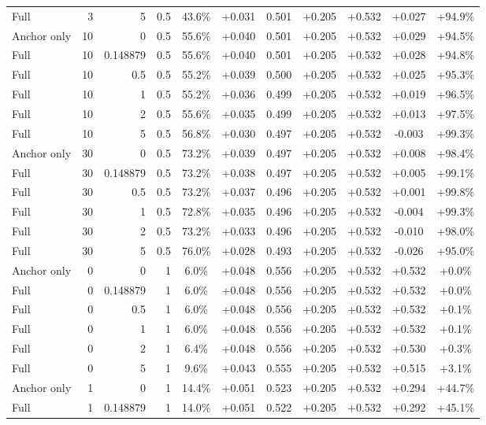\begin{table}[htbp]
\begin{tabular}{lrrrccccccc}
Full & 3 & 5 & 0.5 & 43.6\% & +0.031 & 0.501 & +0.205 & +0.532 & +0.027 & +94.9\% \\
Anchor only & 10 & 0 & 0.5 & 55.6\% & +0.040 & 0.501 & +0.205 & +0.532 & +0.029 & +94.5\% \\
Full & 10 & 0.148879 & 0.5 & 55.6\% & +0.040 & 0.501 & +0.205 & +0.532 & +0.028 & +94.8\% \\
Full & 10 & 0.5 & 0.5 & 55.2\% & +0.039 & 0.500 & +0.205 & +0.532 & +0.025 & +95.3\% \\
Full & 10 & 1 & 0.5 & 55.2\% & +0.036 & 0.499 & +0.205 & +0.532 & +0.019 & +96.5\% \\
Full & 10 & 2 & 0.5 & 55.6\% & +0.035 & 0.499 & +0.205 & +0.532 & +0.013 & +97.5\% \\
Full & 10 & 5 & 0.5 & 56.8\% & +0.030 & 0.497 & +0.205 & +0.532 & -0.003 & +99.3\% \\
Anchor only & 30 & 0 & 0.5 & 73.2\% & +0.039 & 0.497 & +0.205 & +0.532 & +0.008 & +98.4\% \\
Full & 30 & 0.148879 & 0.5 & 73.2\% & +0.038 & 0.497 & +0.205 & +0.532 & +0.005 & +99.1\% \\
Full & 30 & 0.5 & 0.5 & 73.2\% & +0.037 & 0.496 & +0.205 & +0.532 & +0.001 & +99.8\% \\
Full & 30 & 1 & 0.5 & 72.8\% & +0.035 & 0.496 & +0.205 & +0.532 & -0.004 & +99.3\% \\
Full & 30 & 2 & 0.5 & 73.2\% & +0.033 & 0.496 & +0.205 & +0.532 & -0.010 & +98.0\% \\
Full & 30 & 5 & 0.5 & 76.0\% & +0.028 & 0.493 & +0.205 & +0.532 & -0.026 & +95.0\% \\
Anchor only & 0 & 0 & 1 & 6.0\% & +0.048 & 0.556 & +0.205 & +0.532 & +0.532 & +0.0\% \\
Full & 0 & 0.148879 & 1 & 6.0\% & +0.048 & 0.556 & +0.205 & +0.532 & +0.532 & +0.0\% \\
Full & 0 & 0.5 & 1 & 6.0\% & +0.048 & 0.556 & +0.205 & +0.532 & +0.532 & +0.1\% \\
Full & 0 & 1 & 1 & 6.0\% & +0.048 & 0.556 & +0.205 & +0.532 & +0.532 & +0.1\% \\
Full & 0 & 2 & 1 & 6.4\% & +0.048 & 0.556 & +0.205 & +0.532 & +0.530 & +0.3\% \\
Full & 0 & 5 & 1 & 9.6\% & +0.043 & 0.555 & +0.205 & +0.532 & +0.515 & +3.1\% \\
Anchor only & 1 & 0 & 1 & 14.4\% & +0.051 & 0.523 & +0.205 & +0.532 & +0.294 & +44.7\% \\
Full & 1 & 0.148879 & 1 & 14.0\% & +0.051 & 0.522 & +0.205 & +0.532 & +0.292 & +45.1\% \\

\end{tabular}
\end{table}
